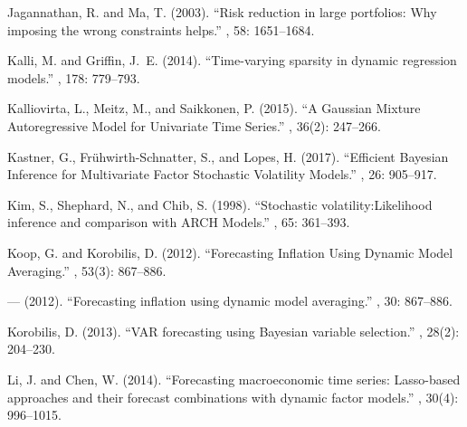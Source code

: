 \documentclass[ba]{imsart}
\numberwithin{equation}{section}
\theoremstyle{plain}
\begin{document}
\begin{thebibliography}{70}
Jagannathan, R. and Ma, T. (2003).
\newblock \enquote{Risk reduction in large portfolios: Why imposing the wrong
  constraints helps.}
, 58: 1651--1684.
\endbibitem

Kalli, M. and Griffin, J.~E. (2014).
\newblock \enquote{Time-varying sparsity in dynamic regression models.}
, 178: 779--793.
\endbibitem

Kalliovirta, L., Meitz, M., and Saikkonen, P. (2015).
\newblock \enquote{A Gaussian Mixture Autoregressive Model for Univariate Time
  Series.}
, 36(2): 247--266.
\endbibitem

Kastner, G., Fr\"{u}hwirth-Schnatter, S., and Lopes, H. (2017).
\newblock \enquote{Efficient Bayesian Inference for Multivariate Factor
  Stochastic Volatility Models.}
, 26:
  905--917.
\endbibitem

Kim, S., Shephard, N., and Chib, S. (1998).
\newblock \enquote{Stochastic volatility:{L}ikelihood inference and comparison
  with {ARCH} Models.}
, 65: 361--393.
\endbibitem

Koop, G. and Korobilis, D. (2012{}).
\newblock \enquote{{Forecasting Inflation Using Dynamic Model Averaging}.}
, 53(3): 867--886.
\endbibitem

--- (2012{}).
\newblock \enquote{Forecasting inflation using dynamic model averaging.}
, 30: 867--886.
\endbibitem

Korobilis, D. (2013).
\newblock \enquote{{VAR} forecasting using {B}ayesian variable selection.}
, 28(2): 204--230.
\endbibitem

Li, J. and Chen, W. (2014).
\newblock \enquote{Forecasting macroeconomic time series: Lasso-based
  approaches and their forecast combinations with dynamic factor models.}
, 30(4): 996--1015.
\endbibitem


\end{thebibliography}
\end{document}
